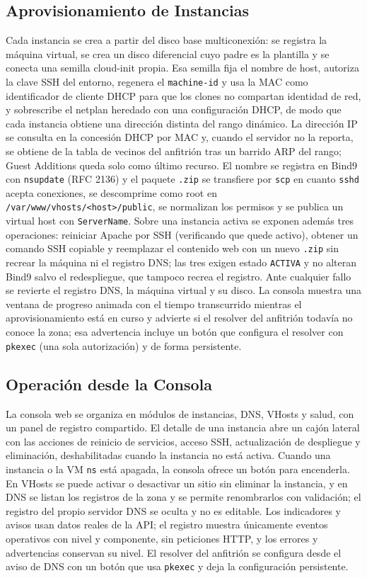 \subsection{Aprovisionamiento de Instancias}
Cada instancia se crea a partir del disco base multiconexión: se registra la máquina virtual, se crea un disco diferencial cuyo padre es la plantilla y se conecta una semilla cloud-init propia. Esa semilla fija el nombre de host, autoriza la clave SSH del entorno, regenera el \texttt{machine-id} y usa la MAC como identificador de cliente DHCP para que los clones no compartan identidad de red, y sobrescribe el netplan heredado con una configuración DHCP, de modo que cada instancia obtiene una dirección distinta del rango dinámico. La dirección IP se consulta en la concesión DHCP por MAC y, cuando el servidor no la reporta, se obtiene de la tabla de vecinos del anfitrión tras un barrido ARP del rango; Guest Additions queda solo como último recurso. El nombre se registra en Bind9 con \texttt{nsupdate} (RFC 2136) y el paquete \texttt{.zip} se transfiere por \texttt{scp} en cuanto \texttt{sshd} acepta conexiones, se descomprime como root en \texttt{/var/www/vhosts/<host>/public}, se normalizan los permisos y se publica un virtual host con \texttt{ServerName}. Sobre una instancia activa se exponen además tres operaciones: reiniciar Apache por SSH (verificando que quede activo), obtener un comando SSH copiable y reemplazar el contenido web con un nuevo \texttt{.zip} sin recrear la máquina ni el registro DNS; las tres exigen estado \texttt{ACTIVA} y no alteran Bind9 salvo el redespliegue, que tampoco recrea el registro. Ante cualquier fallo se revierte el registro DNS, la máquina virtual y su disco. La consola muestra una ventana de progreso animada con el tiempo transcurrido mientras el aprovisionamiento está en curso y advierte si el resolver del anfitrión todavía no conoce la zona; esa advertencia incluye un botón que configura el resolver con \texttt{pkexec} (una sola autorización) y de forma persistente.

\subsection{Operación desde la Consola}
La consola web se organiza en módulos de instancias, DNS, VHosts y salud, con un panel de registro compartido. El detalle de una instancia abre un cajón lateral con las acciones de reinicio de servicios, acceso SSH, actualización de despliegue y eliminación, deshabilitadas cuando la instancia no está activa. Cuando una instancia o la VM \texttt{ns} está apagada, la consola ofrece un botón para encenderla. En VHosts se puede activar o desactivar un sitio sin eliminar la instancia, y en DNS se listan los registros de la zona y se permite renombrarlos con validación; el registro del propio servidor DNS se oculta y no es editable. Los indicadores y avisos usan datos reales de la API; el registro muestra únicamente eventos operativos con nivel y componente, sin peticiones HTTP, y los errores y advertencias conservan su nivel. El resolver del anfitrión se configura desde el aviso de DNS con un botón que usa \texttt{pkexec} y deja la configuración persistente.

